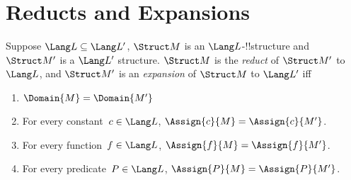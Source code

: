 \documentclass[../../include/open-logic-section]{subfiles}
\begin{document}
\section{Reducts and Expansions}

\begin{defn}
Suppose $\Lang L \subseteq \Lang L'$, $\Struct M$ is an
$\Lang L$-!!{structure} and $\Struct M'$ is a $\Lang L'$ structure.
$\Struct M$ is the \emph{reduct} of $\Struct M'$ to $\Lang L$, and
$\Struct M'$ is an \emph{expansion} of $\Struct M$ to $\Lang L'$ iff
\begin{enumerate}
\item $\Domain{M} = \Domain{M'}$
\item For every constant~$c \in \Lang L$, $\Assign{c}{M} =
  \Assign{c}{M'}$.
\item For every function~$f \in \Lang L$, $\Assign{f}{M} =
  \Assign{f}{M'}$.
\item For every predicate~$P \in \Lang L$, $\Assign{P}{M} =
  \Assign{P}{M'}$.
\end{enumerate}
\end{defn}

\end{document}
